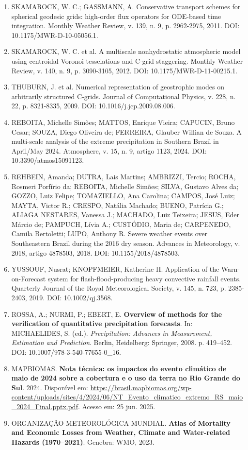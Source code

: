 \documentclass[12pt,a4paper,oneside]{book}
\begin{document}
\begin{enumerate}
\item
  SKAMAROCK, W. C.; GASSMANN, A. Conservative transport schemes for spherical geodesic grids: high-order flux operators for ODE-based time integration. Monthly Weather Review, v. 139, n. 9, p. 2962-2975, 2011. DOI: 10.1175/MWR-D-10-05056.1.
\item
  SKAMAROCK, W. C. et al. A multiscale nonhydrostatic atmospheric model using centroidal Voronoi tesselations and C-grid staggering. Monthly Weather Review, v. 140, n. 9, p. 3090-3105, 2012. DOI: 10.1175/MWR-D-11-00215.1.
\item
  THUBURN, J. et al. Numerical representation of geostrophic modes on arbitrarily structured C-grids. Journal of Computational Physics, v. 228, n. 22, p. 8321-8335, 2009. DOI: 10.1016/j.jcp.2009.08.006.
\item
  REBOITA, Michelle Simões; MATTOS, Enrique Vieira; CAPUCIN, Bruno Cesar; SOUZA, Diego Oliveira de; FERREIRA, Glauber Willian de Souza. A multi-scale analysis of the extreme precipitation in Southern Brazil in April/May 2024. Atmosphere, v. 15, n. 9, artigo 1123, 2024. DOI: 10.3390/atmos15091123.
\item
  REHBEIN, Amanda; DUTRA, Lais Martins; AMBRIZZI, Tercio; ROCHA, Rosmeri Porfírio da; REBOITA, Michelle Simões; SILVA, Gustavo Alves da; GOZZO, Luiz Felipe; TOMAZIELLO, Ana Carolina; CAMPOS, José Luiz; MAYTA, Victor R.; CRESPO, Natália Machado; BUENO, Patrícia G.; ALIAGA NESTARES, Vanessa J.; MACHADO, Luiz Teixeira; JESUS, Eder Márcio de; PAMPUCH, Lívia A.; CUSTÓDIO, Maria de; CARPENEDO, Camila Bertoletti; LUPO, Anthony R. Severe weather events over Southeastern Brazil during the 2016 dry season. Advances in Meteorology, v. 2018, artigo 4878503, 2018. DOI: 10.1155/2018/4878503.
\item
  YUSSOUF, Nusrat; KNOPFMEIER, Katherine H. Application of the Warn-on-Forecast system for flash-flood-producing heavy convective rainfall events. Quarterly Journal of the Royal Meteorological Society, v. 145, n. 723, p. 2385-2403, 2019. DOI: 10.1002/qj.3568.
\item
  ROSSA, A.; NURMI, P.; EBERT, E. \textbf{Overview of methods for the verification of quantitative precipitation forecasts}. In: MICHAELIDES, S. (ed.). \emph{Precipitation: Advances in Measurement, Estimation and Prediction}. Berlin, Heidelberg: Springer, 2008. p. 419--452. DOI: 10.1007/978-3-540-77655-0\_16.
\item
  MAPBIOMAS. \textbf{Nota técnica: os impactos do evento climático de maio de 2024 sobre a cobertura e o uso da terra no Rio Grande do Sul}. 2024. Disponível em: \url{https://brasil.mapbiomas.org/wp-content/uploads/sites/4/2024/06/NT\_Evento\_climatico\_extremo\_RS\_maio\_2024\_Final.pptx.pdf}. Acesso em: 25 jun. 2025.
\item
  ORGANIZAÇÃO METEOROLÓGICA MUNDIAL. \textbf{Atlas of Mortality and Economic Losses from Weather, Climate and Water-related Hazards (1970--2021)}. Genebra: WMO, 2023.
\end{enumerate}
\end{document}
